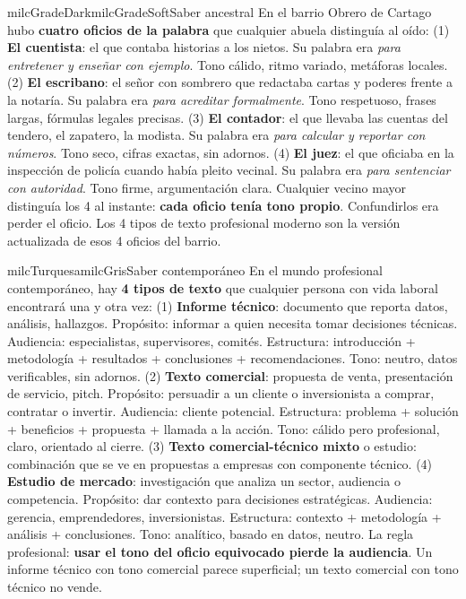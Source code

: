 \documentclass[11pt,letterpaper]{article}
\begin{document}
\begin{softbox}{milcGradeDark}{milcGradeSoft}{Saber ancestral}
En el barrio Obrero de Cartago hubo \textbf{cuatro oficios de la palabra} que cualquier abuela distinguía al oído: (1) \textbf{El cuentista}: el que contaba historias a los nietos. Su palabra era \emph{para entretener y enseñar con ejemplo}. Tono cálido, ritmo variado, metáforas locales. (2) \textbf{El escribano}: el señor con sombrero que redactaba cartas y poderes frente a la notaría. Su palabra era \emph{para acreditar formalmente}. Tono respetuoso, frases largas, fórmulas legales precisas. (3) \textbf{El contador}: el que llevaba las cuentas del tendero, el zapatero, la modista. Su palabra era \emph{para calcular y reportar con números}. Tono seco, cifras exactas, sin adornos. (4) \textbf{El juez}: el que oficiaba en la inspección de policía cuando había pleito vecinal. Su palabra era \emph{para sentenciar con autoridad}. Tono firme, argumentación clara. Cualquier vecino mayor distinguía los 4 al instante: \textbf{cada oficio tenía tono propio}. Confundirlos era perder el oficio. Los 4 tipos de texto profesional moderno son la versión actualizada de esos 4 oficios del barrio.
\end{softbox}

\begin{softbox}{milcTurquesa}{milcGris}{Saber contemporáneo}
En el mundo profesional contemporáneo, hay \textbf{4 tipos de texto} que cualquier persona con vida laboral encontrará una y otra vez: (1) \textbf{Informe técnico}: documento que reporta datos, análisis, hallazgos. Propósito: informar a quien necesita tomar decisiones técnicas. Audiencia: especialistas, supervisores, comités. Estructura: introducción + metodología + resultados + conclusiones + recomendaciones. Tono: neutro, datos verificables, sin adornos. (2) \textbf{Texto comercial}: propuesta de venta, presentación de servicio, pitch. Propósito: persuadir a un cliente o inversionista a comprar, contratar o invertir. Audiencia: cliente potencial. Estructura: problema + solución + beneficios + propuesta + llamada a la acción. Tono: cálido pero profesional, claro, orientado al cierre. (3) \textbf{Texto comercial-técnico mixto} o estudio: combinación que se ve en propuestas a empresas con componente técnico. (4) \textbf{Estudio de mercado}: investigación que analiza un sector, audiencia o competencia. Propósito: dar contexto para decisiones estratégicas. Audiencia: gerencia, emprendedores, inversionistas. Estructura: contexto + metodología + análisis + conclusiones. Tono: analítico, basado en datos, neutro. La regla profesional: \textbf{usar el tono del oficio equivocado pierde la audiencia}. Un informe técnico con tono comercial parece superficial; un texto comercial con tono técnico no vende.
\end{softbox}
\end{document}
